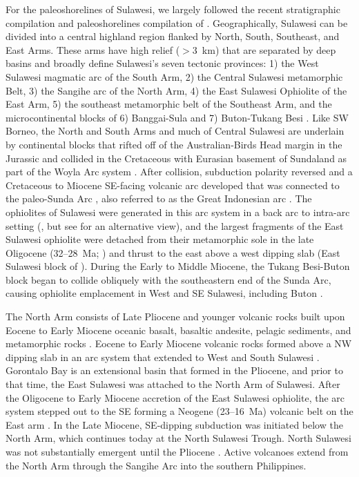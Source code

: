 \documentclass[11pt,letterpaper]{article}
\begin{document}
For the paleoshorelines of Sulawesi, we largely followed the recent stratigraphic compilation and paleoshorelines compilation of \citet{Nugraha2018a}. Geographically, Sulawesi can be divided into a central highland region flanked by North, South, Southeast, and East Arms. These arms have high relief ($>$3~km) that are separated by deep basins and broadly define Sulawesi's seven tectonic provinces: 1) the West Sulawesi magmatic arc of the South Arm, 2) the Central Sulawesi metamorphic Belt, 3) the Sangihe arc of the North Arm, 4) the East Sulawesi Ophiolite of the East Arm, 5) the southeast metamorphic belt of the Southeast Arm, and the microcontinental blocks of 6) Banggai-Sula and 7) Buton-Tukang Besi \citep{Hamilton1979a, Katili1978a}. Like SW Borneo, the North and South Arms and much of Central Sulawesi are underlain by continental blocks that rifted off of the Australian-Birds Head margin in the Jurassic and collided in the Cretaceous with Eurasian basement of Sundaland as part of the Woyla Arc system \citep{Parkinson1998b, Hennig2016a, Hall2017a, Hennig2017a}. After collision, subduction polarity reversed and a Cretaceous to Miocene SE-facing volcanic arc developed \citep{Polve1997a, Elburg1998a} that was connected to the paleo-Sunda Arc \citep{Hall2002b}, also referred to as the Great Indonesian arc \citep{Harris2006a}.  The ophiolites of Sulawesi were generated in this arc system in a back arc to intra-arc setting (\citealp{Monnier1995a}, but see \citealp{Kadarusman2004a} for an alternative view), and the largest fragments of the East Sulawesi ophiolite were detached from their metamorphic sole in the late Oligocene (32--28~Ma; \citealp{Parkinson1998a}) and thrust to the east above a west dipping slab (East Sulawesi block of \citealp{Villeneuve2001a}). During the Early to Middle Miocene, the Tukang Besi-Buton block began to collide obliquely with the southeastern end of the Sunda Arc, causing ophiolite emplacement in West and SE Sulawesi, including Buton \citep{Smith1991a, Bergman1996a}. 

The North Arm consists of Late Pliocene and younger volcanic rocks built upon Eocene to Early Miocene oceanic basalt, basaltic andesite, pelagic sediments, and metamorphic rocks \citep{Elburg1998a}. Eocene to Early Miocene volcanic rocks formed above a NW dipping slab in an arc system that extended to West and South Sulawesi \citep{vanLeeuwen2005a}. Gorontalo Bay is an extensional basin that formed in the Pliocene, and prior to that time, the East Sulawesi was attached to the North Arm of Sulawesi. After the Oligocene to Early Miocene accretion of the East Sulawesi ophiolite, the arc system stepped out to the SE forming a Neogene (23--16~Ma) volcanic belt on the East arm \citep{Kadarusman2004a}. In the Late Miocene, SE-dipping subduction was initiated below the North Arm, which continues today at the North Sulawesi Trough. North Sulawesi was not substantially emergent until the Pliocene \citep{vanLeeuwen2005a}. Active volcanoes extend from the North Arm through the Sangihe Arc into the southern Philippines. 
\end{document}
